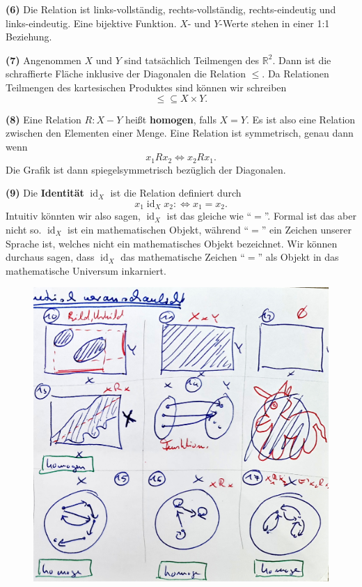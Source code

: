 \documentclass[a4paper]{amsart}
\theoremstyle{definition}
\DeclareMathOperator{\id}{id}
\newcommand{\R}{\ensuremath{\mathbb{ R }}}
\begin{document}
\textbf{(6)} Die Relation ist links-vollständig, rechts-vollständig, rechts-eindeutig und links-eindeutig. Eine bijektive Funktion. $X$- und $Y$-Werte stehen in einer 1:1 Beziehung.

\textbf{(7)} Angenommen $X$ und $Y$ sind tatsächlich Teilmengen des $\R^2$. Dann ist die schraffierte Fläche inklusive der Diagonalen die Relation $\le$. Da Relationen Teilmengen des kartesischen Produktes sind können wir schreiben
\begin{equation}
   \le \subseteq X \times Y.
\end{equation}

\textbf{(8)} Eine Relation $R \colon X - Y$ heißt \textbf{homogen}, falls $X=Y$. Es ist also eine Relation zwischen den Elementen einer Menge. Eine Relation ist symmetrisch, genau dann wenn
\begin{equation}
   x_1Rx_2 \Leftrightarrow x_2Rx_1.
\end{equation}
Die Grafik ist dann spiegelsymmetrisch bezüglich der Diagonalen.

\textbf{(9)} Die \textbf{Identität} $\id_X$ ist die Relation definiert durch
\begin{equation}
   x_1\id_Xx_2 \colon \Leftrightarrow x_1 = x_2.
\end{equation}
Intuitiv könnten wir also sagen, $\id_X$ ist das gleiche wie "`$=$"'. Formal ist das aber nicht so. $\id_X$ ist ein mathematischen Objekt, während "`$=$"' ein Zeichen unserer Sprache ist, welches nicht ein mathematisches Objekt bezeichnet.
Wir können durchaus sagen, dass $\id_X$ das mathematische Zeichen "`$=$"' als Objekt in das mathematische Universum inkarniert.

\begin{figure}
   \centering
   \includegraphics{v3.0.2.0.2 Relationen und Funktionen - Geometrisches Bild Grafik Rechts.png}
\end{figure}
\end{document}
